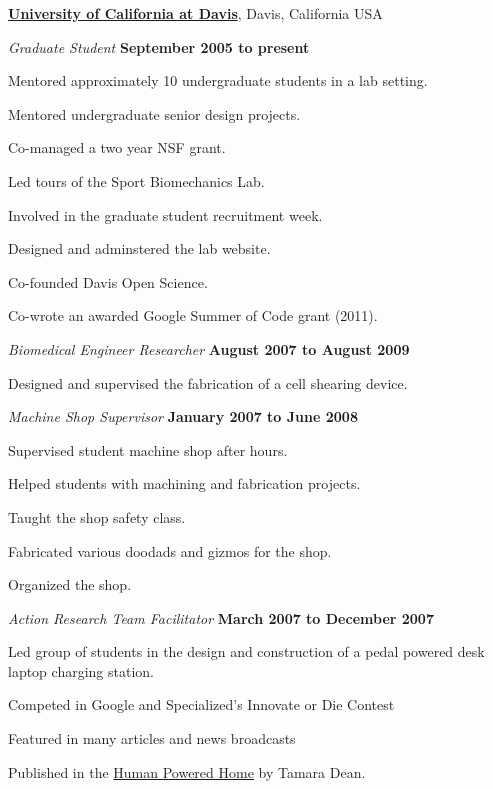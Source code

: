 \documentclass[10pt]{article}
\newenvironment{outerlist}[1][\enskip\textbullet]%
        {\begin{itemize}[#1]}{\end{itemize}%
         \vspace{-.6\baselineskip}}
\newenvironment{innerlist}[1][\enskip\textbullet]%
        {\begin{compactitem}[#1]}{\end{compactitem}}
\begin{document}
\href{http://www.ucdavis.edu}{\textbf{University of California at Davis}}, Davis, California USA
\begin{outerlist}
  \item[] \textit{Graduate Student}%
        \hfill \textbf{September 2005 to present}
  \begin{innerlist}
    \item Mentored approximately 10 undergraduate students in a lab setting.
    \item Mentored undergraduate senior design projects.
    \item Co-managed a two year NSF grant.
    \item Led tours of the Sport Biomechanics Lab.
    \item Involved in the graduate student recruitment week.
    \item Designed and adminstered the lab website.
    \item Co-founded Davis Open Science.
    \item Co-wrote an awarded Google Summer of Code grant (2011).
  \end{innerlist}

  \item[] \textit{Biomedical Engineer Researcher}%
        \hfill \textbf{August 2007 to August 2009}
  \begin{innerlist}
    \item Designed and supervised the fabrication of a cell shearing device.
  \end{innerlist}
  \item[] \textit{Machine Shop Supervisor}%
        \hfill \textbf{January 2007 to June 2008}
  \begin{innerlist}
    \item Supervised student machine shop after hours.
    \item Helped students with machining and fabrication projects.
    \item Taught the shop safety class.
    \item Fabricated various doodads and gizmos for the shop.
    \item Organized the shop.
  \end{innerlist}

\item[] \textit{Action Research Team Facilitator}%
        \hfill \textbf{March 2007 to December 2007}
\begin{innerlist}
  \item Led group of students in the design and construction of a pedal powered desk laptop charging station.
  \item Competed in Google and Specialized's Innovate or Die Contest
  \item Featured in many articles and news broadcasts
  \item Published in the \underline{Human Powered Home} by Tamara Dean.
\end{innerlist}


\end{outerlist}
\end{document}
